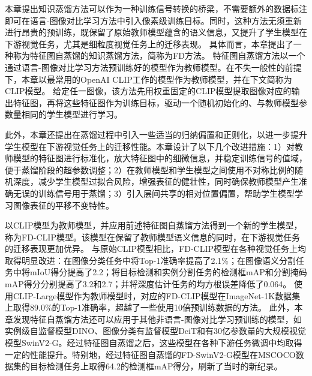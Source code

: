 本章提出知识蒸馏方法可以作为一种训练信号转换的桥梁，不需要额外的数据标注即可在语言-图像对比学习方法中引入像素级训练目标。同时，这种方法无须重新进行昂贵的预训练，既保留了原始教师模型蕴含的语义信息，又提升了学生模型在下游视觉任务，尤其是细粒度视觉任务上的迁移表现。
具体而言，本章提出了一种称为特征图自蒸馏的知识蒸馏方法，简称为FD方法。
特征图自蒸馏方法以一个通过语言-图像对比学习方法预训练好的模型作为教师模型。在不失一般性的前提下，本章以最常用的OpenAI CLIP\cite{radford2021learning}工作的模型作为教师模型，并在下文简称为CLIP模型。
给定任一图像，该方法先用权重固定的CLIP模型提取图像对应的输出特征图，再将这些特征图作为训练目标，驱动一个随机初始化的、与教师模型参数量相同的学生模型进行学习。

此外，本章还提出在蒸馏过程中引入一些适当的归纳偏置和正则化，以进一步提升学生模型在下游视觉任务上的迁移性能。本章设计了以下几个改进措施：1）对教师模型的特征图进行标准化，放大特征图中的细微信息，并稳定训练信号的值域，便于蒸馏阶段的超参数调整；2）在教师模型和学生模型之间使用不对称比例的随机深度，减少学生模型过拟合风险，增强表征的健壮性，同时确保教师模型产生准确无误的训练信号用于蒸馏；3）引入层间共享的相对位置偏置，帮助学生模型学习图像表征的平移不变特性。

以CLIP模型为教师模型，并应用前述特征图自蒸馏方法得到一个新的学生模型，称为FD-CLIP模型。该模型在保留了教师模型语义信息的同时，在下游视觉任务的迁移表现更加优异。
与原始CLIP模型相比，FD-CLIP模型在各种视觉任务上均取得明显改进：在图像分类任务中将Top-1准确率提高了2.1\%；在图像语义分割任务中将mIoU得分提高了2.2；将目标检测和实例分割任务的检测框mAP和分割掩码mAP得分分别提高了3.2和2.7；并将深度估计任务的均方根误差降低了0.064。
使用CLIP-Large模型作为教师模型时，对应的FD-CLIP模型在ImageNet-1K数据集上取得89.0\%的Top-1准确率，超越了一些使用10倍预训练数据的方法。
此外，本章发现特征自蒸馏方法还可以应用于其他非语言-图像对比学习预训练的模型，如实例级自监督模型DINO\cite{dino}、图像分类有监督模型DeiT\cite{deit}和有30亿参数量的大规模视觉模型SwinV2-G\cite{swinv2cvpr}。经过特征图自蒸馏之后，这些模型在各种下游任务微调中均取得一定的性能提升。特别地，经过特征图自蒸馏的FD-SwinV2-G模型在MSCOCO数据集的目标检测任务上取得64.2的检测框mAP得分，刷新了当时的新纪录。

